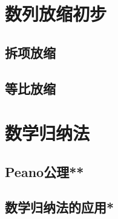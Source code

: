 \section{数列放缩初步}
\clearpage
\subsection{拆项放缩}
\clearpage
\subsection{等比放缩}
\clearpage

\section{数学归纳法}
\subsection{Peano公理**}
\clearpage
\subsection{数学归纳法的应用*}
\clearpage